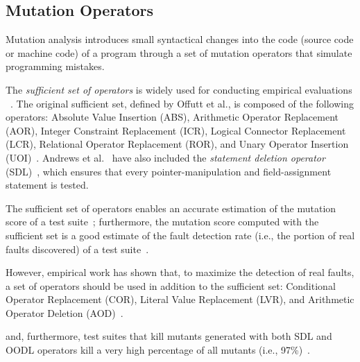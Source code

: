 \subsection{Mutation Operators}
\label{sec:related:operators}

%


Mutation analysis introduces small syntactical changes into the code (source code or machine code) of a program through a set of mutation operators that simulate programming mistakes. 



The  \emph{sufficient set of operators} is widely used for conducting empirical evaluations ~\cite{offutt1996experimental,rothermel1996experimental,andrews2005mutation,kintis2017detecting}. 
The original sufficient set, defined by Offutt et al., is composed of the following operators: Absolute Value Insertion (ABS), Arithmetic Operator Replacement (AOR), Integer Constraint Replacement (ICR), Logical Connector Replacement (LCR), Relational Operator Replacement (ROR), and Unary Operator Insertion (UOI)~\cite{offutt1996experimental}.
Andrews et al.~\cite{andrews2005mutation} have also included the 
\emph{statement deletion operator} (SDL)~\cite{delamaro2014designing}, which ensures that every pointer-manipulation and field-assignment statement is tested. 

The sufficient set of operators enables an accurate estimation of the mutation score of a test suite~\cite{siami2008sufficient}; furthermore, the mutation score computed with the sufficient set is a good estimate of the fault detection rate (i.e., the portion of real faults discovered) of a test suite~\cite{andrews2005mutation,Just:RealFaults:2014}. 

However, empirical work has shown that, to maximize the detection of real faults, a set of operators should be used in addition to the sufficient set: Conditional Operator Replacement (COR),
Literal Value Replacement (LVR), and Arithmetic Operator Deletion (AOD)~\cite{Kintis2018}. 


\cite{delamaro2014designing,delamaro2014experimental} and, furthermore, 
test suites that kill mutants generated with both SDL and OODL operators kill a very high percentage of all mutants (i.e., 97\%)~\cite{delamaro2014experimental}. 

